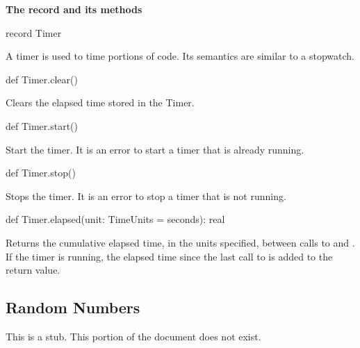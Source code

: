 {\bf The  record and its methods}

\begin{chapel}
record Timer
\end{chapel}
A timer is used to time portions of code.  Its semantics are similar
to a stopwatch.

\begin{chapel}
def Timer.clear()
\end{chapel}
Clears the elapsed time stored in the Timer.

\begin{chapel}
def Timer.start()
\end{chapel}
Start the timer.  It is an error to start a timer that is already
running.

\begin{chapel}
def Timer.stop()
\end{chapel}
Stops the timer.  It is an error to stop a timer that is not running.

\begin{chapel}
def Timer.elapsed(unit: TimeUnits = seconds): real
\end{chapel}
Returns the cumulative elapsed time, in the units specified, between
calls to  and .  If the timer is running, the
elapsed time since the last call to  is added to the
return value.

\subsection{Random Numbers}
\label{Random_Numbers}

This is a stub.  This portion of the document does not exist.
